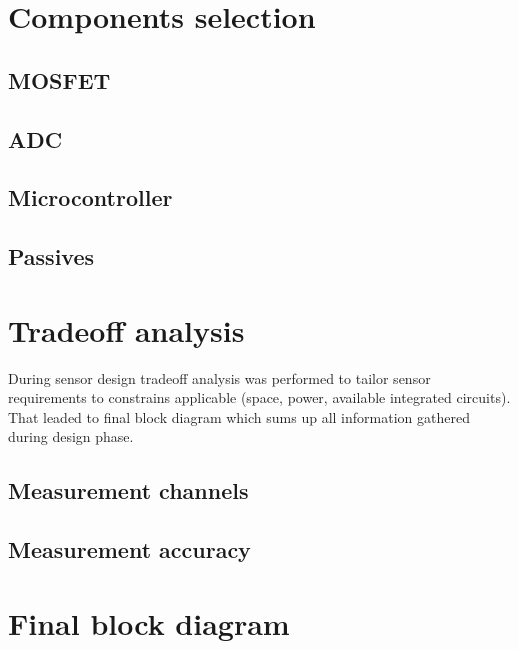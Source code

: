 \section{Components selection}
\subsection{MOSFET}
\subsection{ADC}
\subsection{Microcontroller}
\subsection{Passives}

\section{Tradeoff analysis}
During sensor design tradeoff analysis was performed to tailor sensor requirements to constrains applicable (space, power, available integrated circuits). That leaded to final block diagram which sums up all information gathered during design phase.

\subsection{Measurement channels}
\subsection{Measurement accuracy}


\section{Final block diagram}
